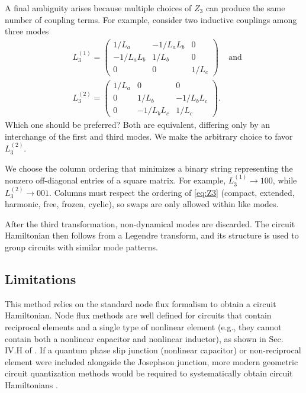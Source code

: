 A final ambiguity arises because multiple choices of $Z_3$ can produce the same number of coupling terms. For example, consider two inductive couplings among three modes
\begin{align}
    &L_3^{(1)} = \begin{pmatrix}
        1/L_{a} & -1/L_{a}L_{b} & 0 \\
        -1/L_{a}L_{b} & 1/L_{b} & 0 \\
        0 & 0 & 1/L_{c}
    \end{pmatrix}\, \quad \textrm{and} \\
    &L_3^{(2)} = \begin{pmatrix}
        1/L_{a} & 0 & 0 \\
        0 & 1/L_{b} & -1/L_{b}L_{c} \\
        0 & -1/L_{b}L_{c} & 1/L_{c}
    \end{pmatrix}.
\end{align}
Which one should be preferred? Both are equivalent, differing only by an interchange of the first and third modes. We make the arbitrary choice to favor $L_3^{(2)}$.

We choose the column ordering that minimizes a binary string representing the nonzero off-diagonal entries of a square matrix. 
For example, $L_3^{(1)} \rightarrow 100$, while $L_3^{(2)} \rightarrow 001$. Columns must respect the ordering of \cref{eq:Z3} (compact, extended, harmonic, free, frozen, cyclic), so swaps are only allowed within like modes.

After the third transformation, non-dynamical modes are discarded. The circuit Hamiltonian then follows from a Legendre transform, and its structure is used to group circuits with similar mode patterns.

\subsection{Limitations}

This method relies on the standard node flux formalism \cite{niggBlackBoxSuperconductingCircuit2012,Solgun2014,YouKoch2019,rasmussenSuperconductingCircuitCompanionan2021a} to obtain a circuit Hamiltonian. Node flux methods are well defined for circuits that contain reciprocal elements and a single type of nonlinear element (e.g., they cannot contain both a nonlinear capacitor and nonlinear inductor), as shown in Sec. IV.H of  \cite{osborne_symplectic_2023}. If a quantum phase slip junction (nonlinear capacitor) or non-reciprocal element were included alongside the Josephson junction, more modern geometric circuit quantization methods would be required to systematically obtain circuit Hamiltonians \cite{osborne_symplectic_2023,parra-rodriguez2023}.

